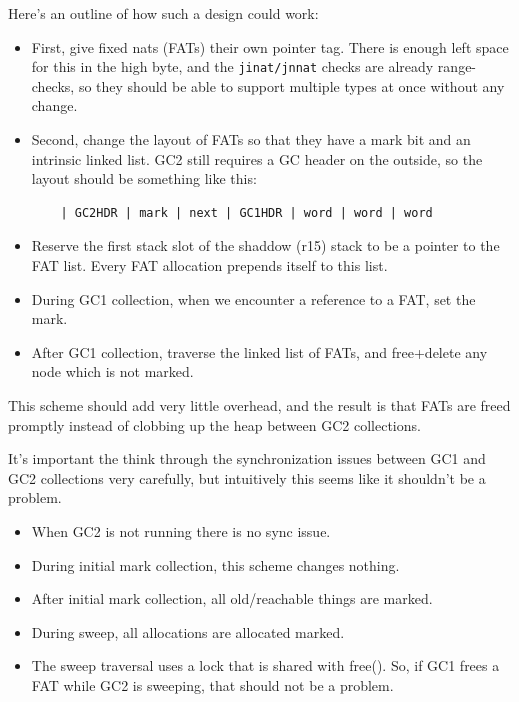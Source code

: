 Here's an outline of how such a design could work:

\begin{itemize}
\item
    First, give fixed nats (FATs) their own pointer tag.  There is enough
    left space for this in the high byte, and the \lstinline|jinat/jnnat|
    checks are already range-checks, so they should be able to support
    multiple types at once without any change.
\item
    Second, change the layout of FATs so that they have a mark bit
    and an intrinsic linked list.  GC2 still requires a GC header on
    the outside, so the layout should be something like this:

    \begin{verbatim}
    | GC2HDR | mark | next | GC1HDR | word | word | word\end{verbatim}
\item
    Reserve the first stack slot of the shaddow (r15) stack to be a
    pointer to the FAT list.  Every FAT allocation prepends itself to
    this list.
\item
    During GC1 collection, when we encounter a reference to a FAT,
    set the mark.
\item
    After GC1 collection, traverse the linked list of FATs, and
    free+delete any node which is not marked.
\end{itemize}

This scheme should add very little overhead, and the result is that FATs
are freed promptly instead of clobbing up the heap between GC2 collections.

It's important the think through the synchronization issues between GC1
and GC2 collections very carefully, but intuitively this seems like it
shouldn't be a problem.

\begin{itemize}
\item When GC2 is not running there is no sync issue.
\item During initial mark collection, this scheme changes nothing.
\item After initial mark collection, all old/reachable things are marked.
\item During sweep, all allocations are allocated marked.
\item The sweep traversal uses a lock that is shared with free().  So,
      if GC1 frees a FAT while GC2 is sweeping, that should not be a problem.
\end{itemize}

